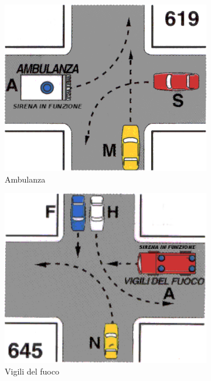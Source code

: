 \begin{figure}[htbp!]
	\centering
	\begin{subfigure}{.3\textwidth}
		\includegraphics[width=\textwidth]{./images/ambulance}
		\caption{Ambulanza}
		\label{fig:amb}
	\end{subfigure}
	\begin{subfigure}{.3\textwidth}
		\includegraphics[width=\textwidth]{./images/fire}
		\caption{Vigili del fuoco}
		\label{fig:fire}
	\end{subfigure}
	\begin{subfigure}{.3\textwidth}

\end{subfigure}
\end{figure}
